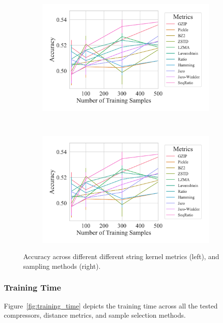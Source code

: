 \documentclass[sigconf]{acmart}
\begin{document}
\begin{figure}
	\begin{subfigure}
		\centering
		\includegraphics[width=.46\textwidth]{figs/truthseeker/metric_vs_accuracy.pdf}
	\end{subfigure}
	~
	\begin{subfigure}
		\centering
		\includegraphics[width=.46\textwidth]{figs/truthseeker/metric_vs_accuracy.pdf}
	\end{subfigure}
	\caption{Accuracy across different different string kernel metrics (left), and sampling methods (right).}
	\label{fig:accuracy}
\end{figure}

\subsubsection{Training Time}

Figure~\ref{fig:training_time} depicts the training time across all the tested compressors, distance metrics, and sample selection methods.
\end{document}
